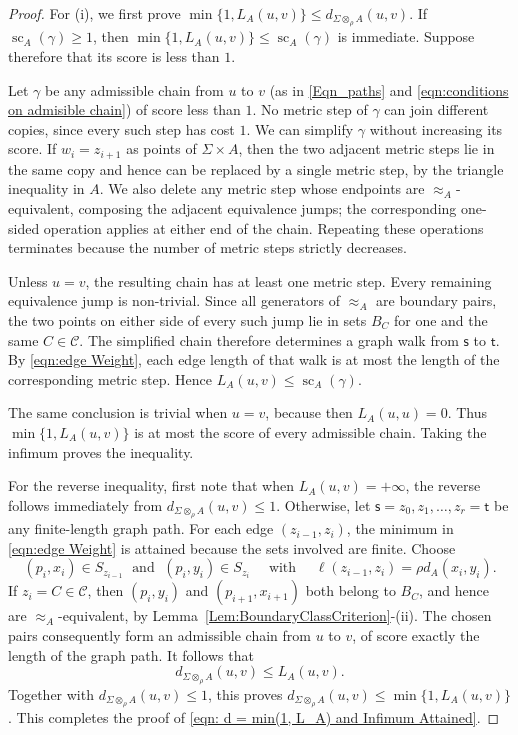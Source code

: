 \documentclass{sn-jnl}%
\theoremstyle{thmstyleone}%
\theoremstyle{thmstyletwo}%
\theoremstyle{thmstylethree}%
\newcommand{\M}{\Sigma}
\newcommand{\dqm}[1]{d_{\M \otimes_{\w} #1}}
\newcommand{\w}{\rho}
\begin{document}
\begin{proof}
For (i), we first prove $\min\{1,L_A(u,v)\}\leq\dqm{A}(u,v)$. If $\operatorname{sc}_A(\gamma)\geq1$, then $\min\{1,L_A(u,v)\}\leq\operatorname{sc}_A(\gamma)$ is immediate. Suppose therefore that its score is less than $1$.

Let $\gamma$ be any admissible chain from $u$ to $v$ (as in \eqref{Eqn_paths} and \eqref{eqn:conditions on admisible chain}) of  score less than $1$.  No metric step of $\gamma$ can join different copies, since every such step has cost $1$. We can simplify $\gamma$ without increasing its score.  If $w_i=z_{i+1}$ as points of $\M\times A$, then the two adjacent metric steps lie in the same copy and hence  can be replaced by a single metric step, by the triangle inequality in $A$. We also delete any metric step whose endpoints are $\approx_A$-equivalent, composing the adjacent equivalence jumps; the corresponding one-sided operation applies at either end of the chain. Repeating these operations terminates because the number of metric steps strictly decreases.

Unless $u=v$, the resulting chain has at least one metric step.  Every remaining equivalence jump is non-trivial.  Since all generators of $\approx_A$ are boundary pairs, the two points on either side of every such jump lie in sets $B_C$ for one and the same $C\in\mathcal C$.  The simplified chain therefore determines a graph walk from $\mathsf s$ to $\mathsf t$.  By \eqref{eqn:edge Weight}, each edge length of that walk is at most the length of the corresponding metric step.  Hence $ L_A(u,v)\leq\operatorname{sc}_A(\gamma)$. 

The same conclusion is trivial when $u=v$, because then $L_A(u,u)=0$.  Thus $\min\{1,L_A(u,v)\}$ is at most the score of every admissible chain.  Taking the infimum proves the inequality.

For the reverse inequality, first note that when $L_A(u,v)=+\infty$, the reverse follows immediately from $\dqm{A}(u,v)\leq1$. Otherwise, let $ \mathsf s=z_0,z_1,\ldots,z_r=\mathsf t $ be any finite-length graph path. For each edge $(z_{i-1},z_i)$, the minimum in \eqref{eqn:edge Weight} is attained because the sets involved are finite.  Choose
\begin{equation} 
\nonumber
   (p_i,x_i)\in S_{z_{i-1}} \; \text{ and } \; (p_i,y_i)\in S_{z_i} \quad \text{ with } \quad    \ell(z_{i-1},z_i)=\rho d_A(x_i,y_i).
\end{equation}
If $z_i=C\in\mathcal C$, then $(p_i,y_i)$ and $(p_{i+1},x_{i+1})$ both belong to $B_C$, and hence are $\approx_A$-equivalent, by Lemma~\ref{Lem:BoundaryClassCriterion}-(ii).  The chosen pairs consequently form an admissible chain from $u$ to $v$, of score exactly the length of the graph path.  It follows that
\begin{equation} 
\nonumber
   \dqm{A}(u,v)\leq L_A(u,v).
\end{equation}
Together with $\dqm{A}(u,v)\leq1$, this proves $\dqm{A}(u,v)\leq\min\{1,L_A(u,v)\}$. This completes the proof of \eqref{eqn: d = min(1, L_A) and Infimum Attained}.


\end{proof}
\end{document}
